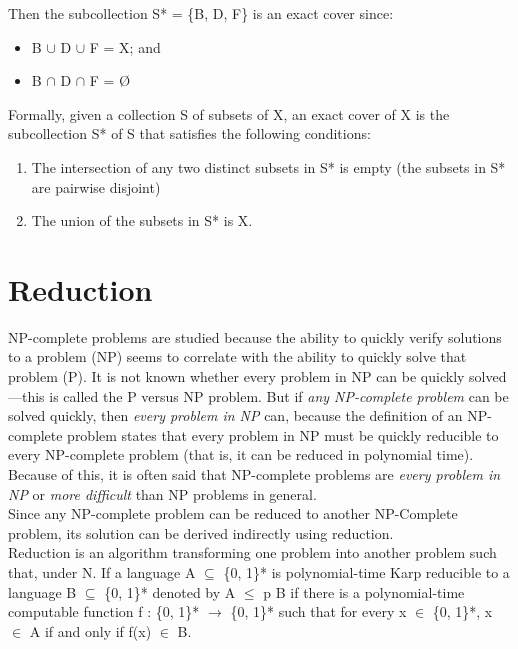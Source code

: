 \documentclass[a4paper,oneside,11pt]{report}
\begin{document}
\vspace{0.8cm}
Then the subcollection S* = \{B, D, F\} is an exact cover since:
\begin{center}
\begin{minipage}{0.5\linewidth}
\begin{itemize}
\item B $\cup$ D $\cup$ F = X; and
\vspace{-0.5cm}
\item B $\cap$ D $\cap$ F = {\O}\\
\end{itemize}
\end{minipage}
\end{center}
Formally, given a collection S of subsets of X, an exact cover of X is the subcollection S* of S that satisfies the following conditions:
\begin{enumerate}[label=\alph*.]
\item The intersection of any two distinct subsets in S* is empty (the subsets in S* are pairwise disjoint)
\item The union of the subsets in S* is X.
\end{enumerate}


\section{Reduction}
NP-complete problems are studied because the ability to quickly verify solutions to a problem (NP) seems to correlate with the ability to quickly solve that problem (P). It is not known whether every problem in NP can be quickly solved—this is called the P versus NP problem. But if \textit{any NP-complete problem} can be solved quickly, then \textit{every problem in NP} can, because the definition of an NP-complete problem states that every problem in NP must be quickly reducible to every NP-complete problem (that is, it can be reduced in polynomial time). Because of this, it is often said that NP-complete problems are \textit{every problem in NP} or \textit{more difficult} than NP problems in general.\\

Since any NP-complete problem can be reduced to another NP-Complete problem, its solution can be derived indirectly using reduction.\\

Reduction is an algorithm transforming one problem into another problem such that, under N. If a language A $\subseteq$ \{0, 1\}* is polynomial-time Karp reducible to a language B $\subseteq$ \{0, 1\}* denoted by A $\leq$ p B if there is a polynomial-time computable function 
f : \{0, 1\}* $\rightarrow$ \{0, 1\}* such that for every x $\in$ \{0, 1\}*, x $\in$ A if and only if f(x) $\in$ B.
\end{document}
